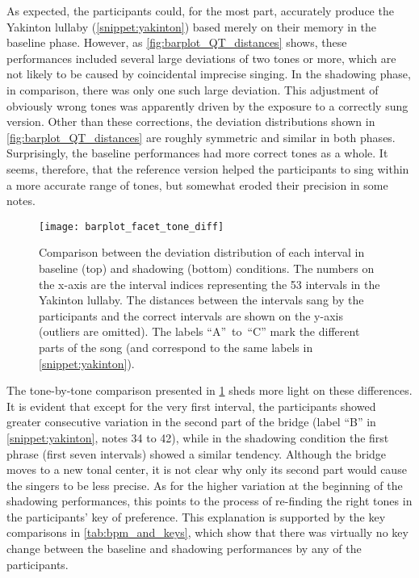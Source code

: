 As expected, the participants could, for the most part, accurately produce the Yakinton lullaby (\cref{snippet:yakinton}) based merely on their memory in the baseline phase.
However, as \cref{fig:barplot_QT_distances} shows, these performances included several large deviations of two tones or more, which are not likely to be caused by coincidental imprecise singing.
In the shadowing phase, in comparison, there was only one such large deviation.
This adjustment of obviously wrong tones was apparently driven by the exposure to a correctly sung version.
Other than these corrections, the deviation distributions shown in \cref{fig:barplot_QT_distances} are roughly symmetric and similar in both phases.
Surprisingly, the baseline performances had more correct tones as a whole.
It seems, therefore, that the reference version helped the participants to sing within a more accurate range of tones, but somewhat eroded their precision in some notes.
%
\begin{figure}[t]
	\centering
	\texttt{[image: barplot\_facet\_tone\_diff]}
	\caption[Comparison of interval deviation between baseline and shadowing performances]
		{Comparison between the deviation distribution of each interval in baseline (top) and shadowing (bottom) conditions.
		The numbers on the x-axis are the interval indices representing the 53 intervals in the Yakinton lullaby.
		The distances between the intervals sang by the participants and the correct intervals are shown on the y-axis (outliers are omitted).
		The labels \enquote{A}~to~\enquote{C} mark the different parts of the song (and correspond to the same labels in \cref{snippet:yakinton}).}
	\label{fig:barplot_facet_tone_diff}
\end{figure}
%
The tone-by-tone comparison presented in \cref{fig:barplot_facet_tone_diff} sheds more light on these differences.
It is evident that except for the very first interval, the participants showed greater consecutive variation in the second part of the bridge (label \enquote{B} in \cref{snippet:yakinton}, notes 34 to 42), while in the shadowing condition the first phrase (first seven intervals) showed a similar tendency.
Although the bridge moves to a new tonal center, it is not clear why only its second part would cause the singers to be less precise.
As for the higher variation at the beginning of the shadowing performances, this points to the process of re-finding the right tones in the participants' key of preference.
This explanation is supported by the key comparisons in \cref{tab:bpm_and_keys}, which show that there was virtually no key change between the baseline and shadowing performances by any of the participants.
